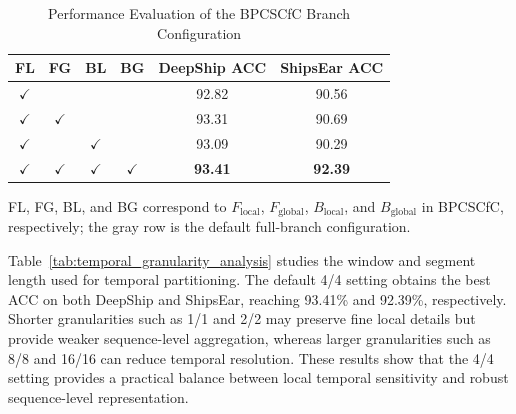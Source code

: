 ﻿\documentclass[lettersize,journal]{IEEEtran}
\begin{document}
\begin{table}[htbp]
\centering
\small
\caption{Performance Evaluation of the BPCSCfC Branch Configuration}
\label{tab:cfc_branch_analysis}
\renewcommand{\arraystretch}{1.2}

\begin{tabular}{c|c|c|c|c|c}
\toprule
FL & FG & BL & BG & DeepShip ACC & ShipsEar ACC \\
\midrule
$\checkmark$ &              &              &              & 92.82 & 90.56 \\
$\checkmark$ & $\checkmark$ &              &              & 93.31 & 90.69 \\
$\checkmark$ &              & $\checkmark$ &              & 93.09 & 90.29 \\

\rowcolor{gray!15}
$\checkmark$ & $\checkmark$ & $\checkmark$ & $\checkmark$
& \textbf{93.41} & \textbf{92.39} \\

\bottomrule
\end{tabular}

\vspace{0.5ex}
\par\footnotesize
FL, FG, BL, and BG correspond to
$F_{\mathrm{local}}$, $F_{\mathrm{global}}$,
$B_{\mathrm{local}}$, and $B_{\mathrm{global}}$
in BPCSCfC, respectively; the gray row is the default
full-branch configuration.
\end{table}

Table~\ref{tab:temporal_granularity_analysis} studies the window and segment length used for temporal partitioning. The default 4/4 setting obtains the best ACC on both DeepShip and ShipsEar, reaching 93.41\% and 92.39\%, respectively. Shorter granularities such as 1/1 and 2/2 may preserve fine local details but provide weaker sequence-level aggregation, whereas larger granularities such as 8/8 and 16/16 can reduce temporal resolution. These results show that the 4/4 setting provides a practical balance between local temporal sensitivity and robust sequence-level representation.
\end{document}
